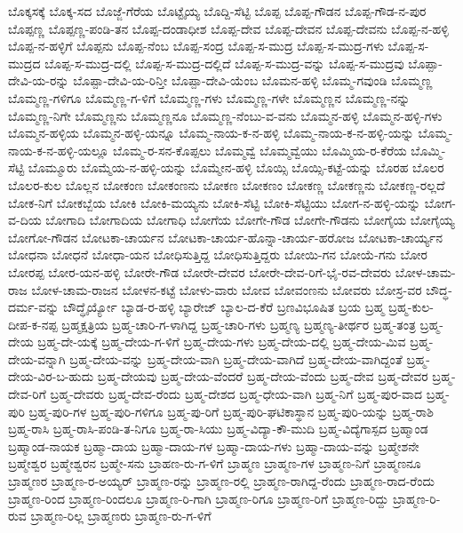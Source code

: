 ಬೊಕ್ಕಸಕ್ಕೆ
ಬೊಕ್ಕ-ಸದ
ಬೊಜ್ಜೆ-ಗೆರೆಯ
ಬೊಟ್ಟೈಯ್ಯ
ಬೊದ್ದಿ-ಸೆಟ್ಟಿ
ಬೊಪ್ಪ
ಬೊಪ್ಪ-ಗೌಡನ
ಬೊಪ್ಪ-ಗೌಡ-ನ-ಪುರ
ಬೊಪ್ಪಣ್ಣ
ಬೊಪ್ಪಣ್ಣ-ಪಂಡಿ-ತನ
ಬೊಪ್ಪ-ದಂಡಾಧೀಶ
ಬೊಪ್ಪ-ದೇವ
ಬೊಪ್ಪ-ದೇವನ
ಬೊಪ್ಪ-ದೇವನು
ಬೊಪ್ಪ-ನ-ಹಳ್ಳಿ
ಬೊಪ್ಪ-ನ-ಹಳ್ಳಿಗೆ
ಬೊಪ್ಪನು
ಬೊಪ್ಪ-ನೆಂಬ
ಬೊಪ್ಪ-ಸಂದ್ರ
ಬೊಪ್ಪ-ಸ-ಮುದ್ರ
ಬೊಪ್ಪ-ಸ-ಮುದ್ರ-ಗಳು
ಬೊಪ್ಪ-ಸ-ಮುದ್ರದ
ಬೊಪ್ಪ-ಸ-ಮುದ್ರ-ದಲ್ಲಿ
ಬೊಪ್ಪ-ಸ-ಮುದ್ರ-ದಲ್ಲಿದೆ
ಬೊಪ್ಪ-ಸ-ಮುದ್ರ-ವನ್ನು
ಬೊಪ್ಪ-ಸ-ಮುದ್ರವು
ಬೊಪ್ಪಾ-ದೇವಿ-ಯ-ರನ್ನು
ಬೊಪ್ಪಾ-ದೇವಿ-ಯ-ರಿನ್ತೀ
ಬೊಪ್ಪಾ-ದೇವಿ-ಯೆಂಬ
ಬೊಮನ-ಹಳ್ಳಿ
ಬೊಮ್ಮ-ಗವುಂಡಿ
ಬೊಮ್ಮಣ್ಣ
ಬೊಮ್ಮಣ್ಣ-ಗಳಿಗೂ
ಬೊಮ್ಮಣ್ಣ-ಗ-ಳಿಗೆ
ಬೊಮ್ಮಣ್ಣ-ಗಳು
ಬೊಮ್ಮಣ್ಣ-ಗಳೇ
ಬೊಮ್ಮಣ್ಣನ
ಬೊಮ್ಮಣ್ಣ-ನನ್ನು
ಬೊಮ್ಮಣ್ಣ-ನಿಗೇ
ಬೊಮ್ಮಣ್ಣನು
ಬೊಮ್ಮಣ್ಣನೂ
ಬೊಮ್ಮಣ್ಣ-ನೆಂಬು-ವ-ವನು
ಬೊಮ್ಮನ-ಹಳ್ಳಿ
ಬೊಮ್ಮನ-ಹಳ್ಳಿ-ಗಳು
ಬೊಮ್ಮನ-ಹಳ್ಳಿಯ
ಬೊಮ್ಮನ-ಹಳ್ಳಿ-ಯನ್ನೂ
ಬೊಮ್ಮ-ನಾಯ-ಕ-ನ-ಹಳ್ಳಿ
ಬೊಮ್ಮ-ನಾಯ-ಕ-ನ-ಹಳ್ಳಿ-ಯನ್ನು
ಬೊಮ್ಮ-ನಾಯ-ಕ-ನ-ಹಳ್ಳಿ-ಯಲ್ಲೂ
ಬೊಮ್ಮ-ರ-ಸನ-ಕೊಪ್ಪಲು
ಬೊಮ್ಮವ್ವೆ
ಬೊಮ್ಮವ್ವೆಯು
ಬೊಮ್ಮಿಯ-ರ-ಕೆರೆಯ
ಬೊಮ್ಮಿ-ಸೆಟ್ಟಿ
ಬೊಮ್ಮೂರು
ಬೊಮ್ಮೆಯ-ನ-ಹಳ್ಳಿ-ಯನ್ನು
ಬೊಮ್ಮೇನ-ಹಳ್ಳಿ
ಬೊಯ್ಸಿ
ಬೊಯ್ಸಿ-ಕಟ್ಟೆ-ಯನ್ನು
ಬೊರಹ
ಬೊಲರ
ಬೊಲರ-ಕುಲ
ಬೊಲ್ಲನ
ಬೋಕಂಣ
ಬೋಕಂಣನು
ಬೋಕಣ
ಬೋಕಣಂ
ಬೋಕಣ್ಣ
ಬೋಕಣ್ಣನು
ಬೋಕಣ್ಣ-ರಲ್ಲದೆ
ಬೋಕ-ನಿಗೆ
ಬೋಕಬ್ಬೆಯ
ಬೋಕಿ
ಬೋಕಿ-ಮಯ್ಯನು
ಬೋಕಿ-ಸೆಟ್ಟಿ
ಬೋಕಿ-ಸೆಟ್ಟಿಯು
ಬೋಗ-ನ-ಹಳ್ಳಿ-ಯನ್ನು
ಬೋಗ-ವ-ದಿಯ
ಬೋಗಾದಿ
ಬೋಗಾದಿಯ
ಬೋಗಾಧಿ
ಬೋಗೆಯ
ಬೋಗೇ-ಗೌಡ
ಬೋಗೇ-ಗೌಡನು
ಬೋಗೈಯ
ಬೋಗೈಯ್ಯ
ಬೋಗೋ-ಗೌಡನ
ಬೋಟಕಾ-ಚಾರ್ಯನ
ಬೋಟಕಾ-ಚಾರ್ಯ-ಹೊನ್ನಾ-ಚಾರ್ಯ-ಹರೋಜ
ಬೋಟಕಾ-ಚಾರ್ಯ್ಯನ
ಬೋಧನಾ
ಬೋಧನೆ
ಬೋಧಾ-ಯನ
ಬೋಧಿಸುತ್ತಿದ್ದ
ಬೋಧಿಸುತ್ತಿದ್ದರು
ಬೋಯಿ-ಗನ
ಬೋಯೆ-ಗನು
ಬೋರ
ಬೋರಪ್ಪ
ಬೋರ-ಯನ-ಹಳ್ಳಿ
ಬೋರೇ-ಗೌಡ
ಬೋರೇ-ದೇವರ
ಬೋರೇ-ದೇವ-ರಿಗೆ-ಭೈ-ರವ-ದೇವರು
ಬೋಳ-ಚಾಮ-ರಾಜ
ಬೋಳ-ಚಾಮ-ರಾಜನ
ಬೋಳನ-ಕಟ್ಟೆ
ಬೋಳು-ವಾರು
ಬೋವ
ಬೋವಂಣನು
ಬೋವರು
ಬೋಸ್ರ-ವರ
ಬೌದ್ಧ-ದರ್ಮ-ವನ್ನು
ಬೌದ್ಧೈರ್ಯ್ಯೋ
ಬ್ಯಾಡ-ರ-ಹಳ್ಳಿ
ಬ್ಯಾರೇಜ್
ಬ್ಯಾಲ-ದ-ಕೆರೆ
ಬ್ರಣವಿಭೂಷಿತ
ಬ್ರಯ
ಬ್ರಹ್ಮ
ಬ್ರಹ್ಮ-ಕುಲ-ದೀಪ-ಕ-ನಪ್ಪ
ಬ್ರಹ್ಮಕ್ಷತ್ರಿಯ
ಬ್ರಹ್ಮ-ಚಾರಿ-ಗ-ಳಾಗಿದ್ದ
ಬ್ರಹ್ಮ-ಚಾರಿ-ಗಳು
ಬ್ರಹ್ಮಣ್ಯ
ಬ್ರಹ್ಮಣ್ಯ-ತೀರ್ಥರ
ಬ್ರಹ್ಮ-ತಂತ್ರ
ಬ್ರಹ್ಮ-ದೇಯ
ಬ್ರಹ್ಮ-ದೇ-ಯಕ್ಕೆ
ಬ್ರಹ್ಮ-ದೇಯ-ಗ-ಳಿಗೆ
ಬ್ರಹ್ಮ-ದೇಯ-ಗಳು
ಬ್ರಹ್ಮ-ದೇಯ-ದಲ್ಲಿ
ಬ್ರಹ್ಮ-ದೇಯ-ಮಿವ
ಬ್ರಹ್ಮ-ದೇಯ-ವನ್ನಾಗಿ
ಬ್ರಹ್ಮ-ದೇಯ-ವನ್ನು
ಬ್ರಹ್ಮ-ದೇಯ-ವಾಗಿ
ಬ್ರಹ್ಮ-ದೇಯ-ವಾಗಿದೆ
ಬ್ರಹ್ಮ-ದೇಯ-ವಾಗಿದ್ದಂತೆ
ಬ್ರಹ್ಮ-ದೇಯ-ವಿರ-ಬ-ಹುದು
ಬ್ರಹ್ಮ-ದೇಯವು
ಬ್ರಹ್ಮ-ದೇಯ-ವೆಂದರೆ
ಬ್ರಹ್ಮ-ದೇಯ-ವೆಂದು
ಬ್ರಹ್ಮ-ದೇವ
ಬ್ರಹ್ಮ-ದೇವರ
ಬ್ರಹ್ಮ-ದೇವ-ರಿಗೆ
ಬ್ರಹ್ಮ-ದೇವರು
ಬ್ರಹ್ಮ-ದೇವ-ರೆಂದು
ಬ್ರಹ್ಮ-ದೇಶದ
ಬ್ರಹ್ಮ-ಧೇಯ-ವಾಗಿ
ಬ್ರಹ್ಮ-ನಿಗೆ
ಬ್ರಹ್ಮ-ಪುರ-ವಾದ
ಬ್ರಹ್ಮ-ಪುರಿ
ಬ್ರಹ್ಮ-ಪುರಿ-ಗಳ
ಬ್ರಹ್ಮ-ಪುರಿ-ಗಳಿಗೂ
ಬ್ರಹ್ಮ-ಪು-ರಿಗೆ
ಬ್ರಹ್ಮ-ಪುರಿ-ಘಟಿಕಾಸ್ಥಾನ
ಬ್ರಹ್ಮ-ಪುರಿ-ಯನ್ನು
ಬ್ರಹ್ಮ-ರಾಶಿ
ಬ್ರಹ್ಮ-ರಾಸಿ
ಬ್ರಹ್ಮ-ರಾಸಿ-ಪಂಡಿ-ತ-ನಿಗೂ
ಬ್ರಹ್ಮ-ರಾ-ಸಿಯು
ಬ್ರಹ್ಮ-ವಿದ್ಯಾ-ಕೌ-ಮುದಿ
ಬ್ರಹ್ಮ-ವಿದ್ಯೆಗಾಸ್ಪದ
ಬ್ರಹ್ಮಾಂಡ
ಬ್ರಹ್ಮಾಂಡ-ನಾಯಕ
ಬ್ರಹ್ಮಾ-ದಾಯ
ಬ್ರಹ್ಮಾ-ದಾಯ-ಗಳ
ಬ್ರಹ್ಮಾ-ದಾಯ-ಗಳು
ಬ್ರಹ್ಮಾ-ದಾಯ-ವನ್ನು
ಬ್ರಹ್ಮೇಶನೇ
ಬ್ರಹ್ಮೇಶ್ವರ
ಬ್ರಹ್ಮೇಶ್ವರನ
ಬ್ರಹ್ಮೇ-ಸನು
ಬ್ರಾಹಣ-ರು-ಗ-ಳಿಗೆ
ಬ್ರಾಹ್ಮಣ
ಬ್ರಾಹ್ಮಣ-ಗಳ
ಬ್ರಾಹ್ಮಣ-ನಿಗೆ
ಬ್ರಾಹ್ಮಣನೂ
ಬ್ರಾಹ್ಮಣರ
ಬ್ರಾಹ್ಮಣ-ರ-ಅಯ್ಯರ್
ಬ್ರಾಹ್ಮಣ-ರನ್ನು
ಬ್ರಾಹ್ಮಣ-ರಲ್ಲಿ
ಬ್ರಾಹ್ಮಣ-ರಾಗಿದ್ದ-ರೆಂದು
ಬ್ರಾಹ್ಮಣ-ರಾದ-ರೆಂದು
ಬ್ರಾಹ್ಮಣ-ರಿಂದ
ಬ್ರಾಹ್ಮಣ-ರಿಂದಲೂ
ಬ್ರಾಹ್ಮಣ-ರಿ-ಗಾಗಿ
ಬ್ರಾಹ್ಮಣ-ರಿಗೂ
ಬ್ರಾಹ್ಮಣ-ರಿಗೆ
ಬ್ರಾಹ್ಮಣ-ರಿದ್ದು
ಬ್ರಾಹ್ಮಣ-ರಿ-ರುವ
ಬ್ರಾಹ್ಮಣ-ರಿಲ್ಲ
ಬ್ರಾಹ್ಮಣರು
ಬ್ರಾಹ್ಮಣ-ರು-ಗ-ಳಿಗೆ
